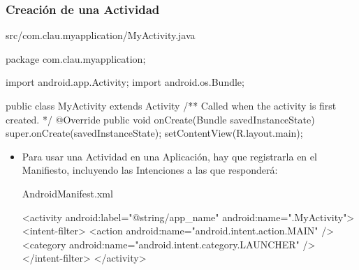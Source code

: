 \documentclass[hyperref={pdfpagelabels=true},ucs]{beamer}
\begin{document}
\begin{frame}[fragile,shrink=25]
\frametitle{Creación de una Actividad}

\begin{scriptsize}
\begin{block}{src/com.clau.myapplication/MyActivity.java}
\begin{java}
  package com.clau.myapplication;

  import android.app.Activity; 
  import android.os.Bundle;

  public class MyActivity extends Activity { 
    /** Called when the activity is first created. */ 
    @Override 
    public void onCreate(Bundle savedInstanceState) { 
      super.onCreate(savedInstanceState);
      setContentView(R.layout.main);
    }
  }
\end{java}
\end{block}
\end{scriptsize}

\begin{itemize}
\item Para usar una Actividad en una Aplicación, hay que registrarla
  en el \alert{Manifiesto}, incluyendo las Intenciones a las que responderá:
\begin{scriptsize}
\begin{block}{AndroidManifest.xml}
\begin{xml}
<activity android:label="@string/app_name"
          android:name=".MyActivity">
  <intent-filter>
    <action android:name="android.intent.action.MAIN" />
    <category android:name="android.intent.category.LAUNCHER" />
  </intent-filter>
</activity>
\end{xml}
\end{block}
\end{scriptsize}

\end{itemize}


\end{frame}
\end{document}
